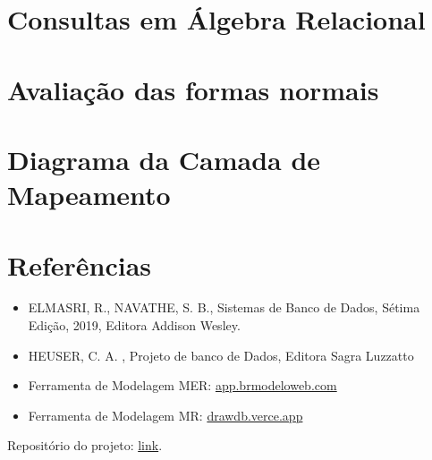 \documentclass{article}
\begin{document}
\section{Consultas em Álgebra Relacional}

\section{Avaliação das formas normais}

\section{Diagrama da Camada de Mapeamento}

\section{Referências}
\begin{itemize}
        \item ELMASRI, R., NAVATHE, S. B., Sistemas de Banco de Dados, Sétima Edição, 2019, Editora Addison Wesley.
        \item HEUSER, C. A. , Projeto de banco de Dados, Editora Sagra Luzzatto
        \item Ferramenta de Modelagem MER: \href{https://app.brmodeloweb.com/#!/conceptual/66dd8939bb821248818df271}{app.brmodeloweb.com}
        \item Ferramenta de Modelagem MR: \href{https://drawdb.vercel.app/}{drawdb.verce.app}
\end{itemize}

Repositório do projeto: \href{https://github.com/qrno/BD-2024-1}{link}.
\end{document}

